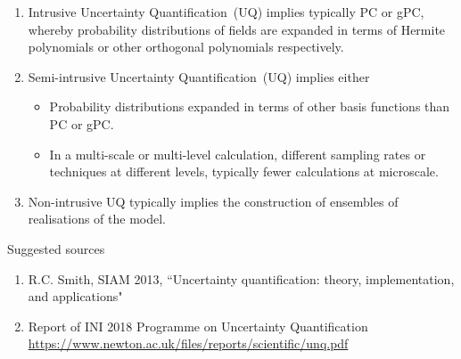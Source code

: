 \begin{enumerate}
\item Intrusive Uncertainty Quantification~(UQ) implies
typically PC or gPC, whereby probability distributions
of fields are expanded in terms of Hermite polynomials
or other orthogonal polynomials respectively.
\item Semi-intrusive Uncertainty Quantification~(UQ) implies either
\begin{itemize}
\item Probability distributions expanded in terms of
other basis functions than PC or gPC.
\item In a multi-scale or multi-level calculation, different
sampling rates or techniques at different levels, typically
fewer calculations at microscale.
\end{itemize}
\item Non-intrusive UQ typically implies the construction of ensembles
of realisations of the model.
\end{enumerate}

Suggested sources
\begin{enumerate}
\item R.C. Smith, SIAM 2013, ``Uncertainty quantification: theory, implementation, and applications"
\item Report of INI 2018 Programme on Uncertainty Quantification \\
\url{https://www.newton.ac.uk/files/reports/scientific/unq.pdf}
\end{enumerate}

